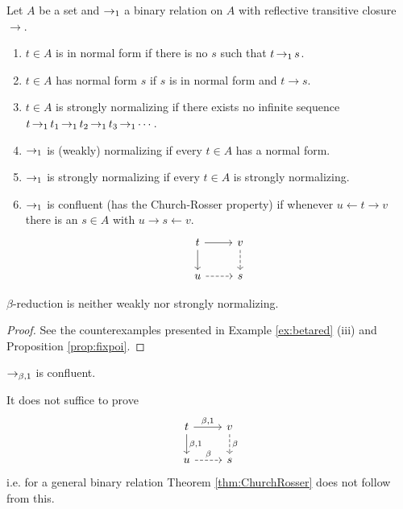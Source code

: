 \begin{boxdefi}
    Let $A$ be a set and $\operatorname{\to_1}$ a binary relation on $A$ with reflective transitive closure $\to$.
    \begin{enumerate}
        \item $t \in A$ is \alert{in normal form} if there is no $s$ such that $t \operatorname{\to_1} s$.
        \item $t \in A$ \alert{has normal form $s$} if $s$ is in normal form and $t \to s$.
        \item $t \in A$ is \alert{strongly normalizing} if there exists no infinite sequence $t \operatorname{\to_1} t_1 \operatorname{\to_1} t_2 \operatorname{\to_1} t_3 \operatorname{\to_1} \cdots$.
        \item $\operatorname{\to_1}$ is \alert{(weakly) normalizing} if every $t \in A$ has a normal form.
        \item $\operatorname{\to_1}$ is \alert{strongly normalizing} if every $t \in A$ is strongly normalizing.
        \item {$\operatorname{\to_1}$ is \alert{confluent} (has the \alert{Church-Rosser property}) if whenever $u \leftarrow t \to v$ there is an $s \in A$ with $u \to s \leftarrow v$.
            \begin{equation*}
            \begin{tikzcd}[ampersand replacement=\&]
                t \ar[r] \ar[d] \& v \ar[d, dashed] \\
                u \ar[r, dashed] \& s 
            \end{tikzcd}
        \end{equation*}}
    \end{enumerate}
\end{boxdefi}

\begin{rem}
    $\beta$-reduction is neither weakly nor strongly normalizing.
\end{rem}
\begin{proof}
    See the counterexamples presented in Example \ref{ex:betared} (iii) and Proposition \ref{prop:fixpoi}.
\end{proof}

\begin{boxthm} \label{thm:ChurchRosser}
    $\operatorname{\to_{\beta, 1}}$ is confluent.
\end{boxthm}

\begin{rem}
    It does not suffice to prove 
    \begin{equation*}
        \begin{tikzcd}
            t \ar[r, "{\beta, 1}"] \ar[d, "{\beta, 1}"] & v \ar[d, dashed, "\beta"] \\
            u \ar[r, dashed, "\beta"] & s 
        \end{tikzcd}
    \end{equation*}
    i.e. for a general binary relation Theorem \ref{thm:ChurchRosser} does not follow from this.
\end{rem}

